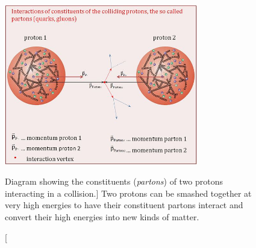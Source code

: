 \begin{figure}[h]
    \centering
    \includegraphics[height=7cm,keepaspectratio]{figures/lhc/proton_proton_quarksandgluons.jpg}
        \caption
            [Diagram showing the constituents (\emph{partons}) of two protons interacting in a \pp collision.]
            {Two protons can be smashed together at very high energies to have their constituent partons interact and convert their high energies into new kinds of matter.} 
        \label{fig:pp_collision}
    \end{figure}









